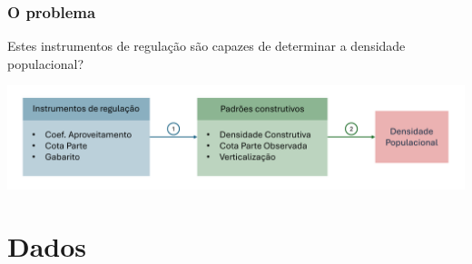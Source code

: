 \documentclass[%
    8pt, 
    aspectratio=169,
]{beamer}
\begin{document}
\begin{frame}
    \frametitle{O problema}
    \centering

    Estes instrumentos de regulação são capazes de determinar a densidade populacional?

    \bigskip
    
    \includegraphics[width = .9\textwidth]{imagens/desenho_proposta.pdf}

\end{frame}

\section{Dados}
\end{document}
